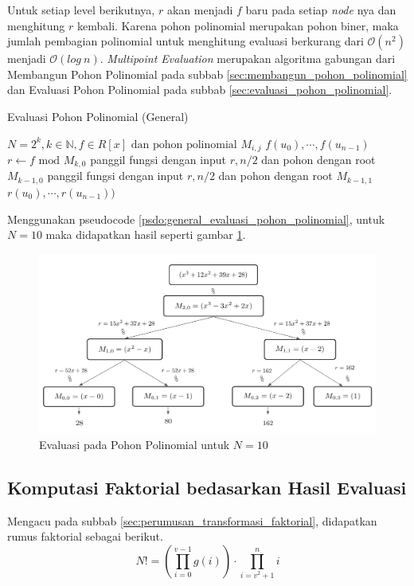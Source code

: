 Untuk setiap level berikutnya, $ r $ akan menjadi $ f $ baru pada setiap \textit{node} nya dan menghitung $ r $ kembali. Karena pohon polinomial merupakan pohon biner, maka jumlah pembagian polinomial untuk menghitung evaluasi berkurang dari $ \mathcal{O}{(n^2)} $ menjadi $ \mathcal{O}{(log \ n)} $. \textit{Multipoint Evaluation} merupakan algoritma gabungan dari Membangun Pohon Polinomial pada subbab \ref{sec:membangun_pohon_polinomial} dan Evaluasi Pohon Polinomial pada subbab \ref{sec:evaluasi_pohon_polinomial}.
\begin{algorithm}
	\caption{Evaluasi Pohon Polinomial (General)}
	\label{psdo:general_evaluasi_pohon_polinomial}
	\begin{algorithmic}[1]
		\Require $ N = 2^k, k \in \mathbb{N},f \in R[x] \text{ dan pohon polinomial } M_{i,j}  $
		\Ensure $ f(u_0), \cdots , f(u_{n-1}) $
		\State $ r \gets f \text{ mod } M_{k,0} $
		\State panggil fungsi dengan input $ r, n/2 $ dan pohon dengan root $ M_{k-1,0} $
		\State panggil fungsi dengan input $ r, n/2 $ dan pohon dengan root $ M_{k-1,1} $ \\
		\Return $ r(u_0), \cdots , r(u_{n-1})) $
	\end{algorithmic}
\end{algorithm}

Menggunakan pseudocode \ref{psdo:general_evaluasi_pohon_polinomial}, untuk $ N = 10 $ maka didapatkan hasil seperti gambar \ref{fig:evaluasi-pohon-n-10}.

\begin{figure}
	\Centering
	\includegraphics [scale=0.25]{bab2/img/evaluasi-pohon-n-10}
	\caption{Evaluasi pada Pohon Polinomial untuk $ N = 10 $}
	\label{fig:evaluasi-pohon-n-10}
\end{figure}


\subsection{ Komputasi Faktorial bedasarkan Hasil Evaluasi}
Mengacu pada subbab \ref{sec:perumusan_transformasi_faktorial}, didapatkan rumus faktorial sebagai berikut.
$$ N ! = \left( \prod_{i=0}^{v-1} g(i) \right) \cdot \prod_{i=v^2+1}^n i $$

